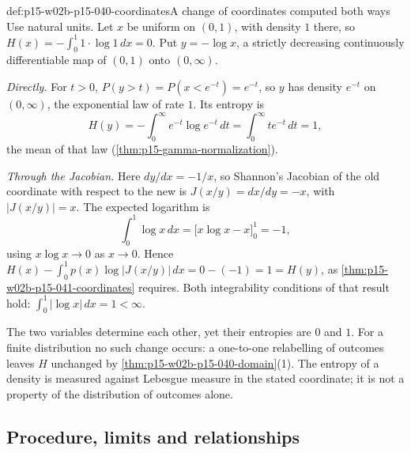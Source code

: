 \begin{hbexample}{def:p15-w02b-p15-040-coordinates}{A change of coordinates computed both ways}
Use natural units. Let \(x\) be uniform on \((0,1)\), with density
\(1\) there, so \(H(x)=-\int_0^1 1\cdot\log1\,dx=0\). Put
\(y=-\log x\), a strictly decreasing continuously differentiable map of
\((0,1)\) onto \((0,\infty)\).

\emph{Directly.} For \(t>0\),
\(P(y>t)=P(x<e^{-t})=e^{-t}\), so \(y\) has density \(e^{-t}\) on
\((0,\infty)\), the exponential law of rate \(1\). Its entropy is
\[
 H(y)=-\int_0^\infty e^{-t}\log e^{-t}\,dt=\int_0^\infty te^{-t}\,dt=1,
\]
the mean of that law (\cref{thm:p15-gamma-normalization}).

\emph{Through the Jacobian.} Here \(dy/dx=-1/x\), so Shannon's Jacobian
of the old coordinate with respect to the new is
\(J(x/y)=dx/dy=-x\), with \(|J(x/y)|=x\). The expected logarithm is
\[
 \int_0^1\log x\,dx=\bigl[x\log x-x\bigr]_{0}^{1}=-1,
\]
using \(x\log x\to0\) as \(x\to0\). Hence
\(H(x)-\int_0^1 p(x)\log|J(x/y)|\,dx=0-(-1)=1=H(y)\), as
\cref{thm:p15-w02b-p15-041-coordinates} requires. Both integrability
conditions of that result hold: \(\int_0^1|\log x|\,dx=1<\infty\).

The two variables determine each other, yet their entropies are
\(0\) and \(1\). For a finite distribution no such change occurs: a
one-to-one relabelling of outcomes leaves \(H\) unchanged by
\cref{thm:p15-w02b-p15-040-domain}(1). The entropy of a density is
measured against Lebesgue measure in the stated coordinate; it is not a
property of the distribution of outcomes alone.
\end{hbexample}

\subsection{Procedure, limits and relationships}
\label{sec:p15-w02b-p15-040-procedure}

